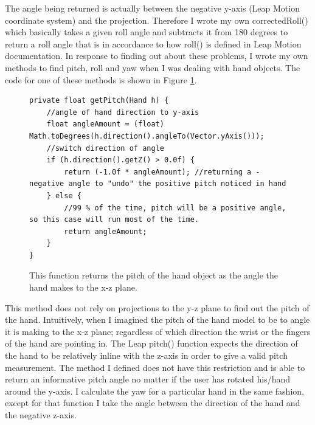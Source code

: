 The angle being returned is actually between the negative y-axis (Leap Motion coordinate system) and the projection. Therefore I wrote my own correctedRoll() which basically takes a given roll angle and subtracts it from 180 degrees to return a roll angle that is in accordance to how roll() is defined in Leap Motion documentation. In response to finding out about these problems, I wrote my own methods to find pitch, roll and yaw when I was dealing with hand objects. The code for one of these methods is shown in Figure \ref{fig:pitchCode}.
\begin{figure}[H]
\centering
\begin{lstlisting}
private float getPitch(Hand h) {
	//angle of hand direction to y-axis
	float angleAmount = (float) Math.toDegrees(h.direction().angleTo(Vector.yAxis()));
	//switch direction of angle
	if (h.direction().getZ() > 0.0f) {
		return (-1.0f * angleAmount); //returning a -negative angle to "undo" the positive pitch noticed in hand
	} else {
		//99 % of the time, pitch will be a positive angle, so this case will run most of the time.
		return angleAmount;
	}
}
\end{lstlisting}
\caption[getPitch() Function]{This function returns the pitch of the hand object as the angle the hand makes to the x-z plane.}
\label{fig:pitchCode}
\end{figure}
This method does not rely on projections to the y-z plane to find out the pitch of the hand. Intuitively, when I imagined the pitch of the hand model to be to angle it is making to the x-z plane; regardless of which direction the wrist or the fingers of the hand are pointing in. The Leap pitch() function expects the direction of the hand to be relatively inline with the z-axis in order to give a valid pitch measurement. The method I defined does not have this restriction and is able to return an informative pitch angle no matter if the user has rotated his/hand around the y-axis. I calculate the yaw for a particular hand in the same fashion, except for that function I take the angle between the direction of the hand and the negative z-axis. 


